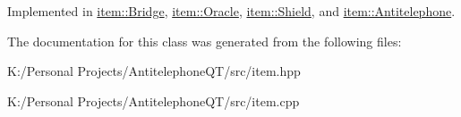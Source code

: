 Implemented in \hyperlink{classitem_1_1_bridge_a175b2a911174c682ea163bc248836a87}{item\+::\+Bridge}, \hyperlink{classitem_1_1_oracle_a9a8911eef902d4dcca95f111fda7c5d0}{item\+::\+Oracle}, \hyperlink{classitem_1_1_shield_a29993d7965fe391d052214cd415eec75}{item\+::\+Shield}, and \hyperlink{classitem_1_1_antitelephone_a1b094baeb7cae7e1161d1aa1650022d1}{item\+::\+Antitelephone}.



The documentation for this class was generated from the following files\+:\begin{DoxyCompactItemize}
\item 
K\+:/\+Personal Projects/\+Antitelephone\+Q\+T/src/item.\+hpp\item 
K\+:/\+Personal Projects/\+Antitelephone\+Q\+T/src/item.\+cpp\end{DoxyCompactItemize}
